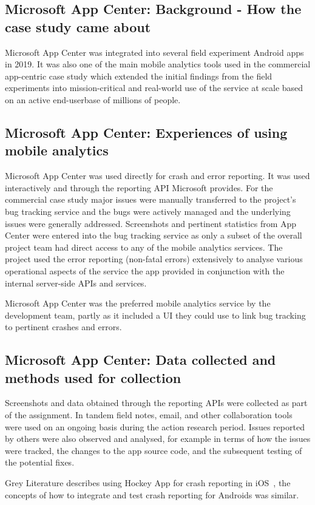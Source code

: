 \subsection{Microsoft App Center: Background - How the case study came about}
Microsoft App Center was integrated into several field experiment Android apps in 2019. It was also one of the main mobile analytics tools used in the commercial app-centric case study which extended the initial findings from the field experiments into mission-critical and real-world use of the service at scale based on an active end-userbase of millions of people.

\subsection{Microsoft App Center: Experiences of using mobile analytics}
Microsoft App Center was used directly for crash and error reporting. It was used interactively and through the reporting API Microsoft provides. For the commercial case study major issues were manually transferred to the project's bug tracking service and the bugs were actively managed and the underlying issues were generally addressed. Screenshots and pertinent statistics from App Center were entered into the bug tracking service as only a subset of the overall project team had direct access to any of the mobile analytics services. The project used the error reporting (non-fatal errors) extensively to analyse various operational aspects of the service the app provided in conjunction with the internal server-side APIs and services.

Microsoft App Center was the preferred mobile analytics service by the development team, partly as it included a UI they could use to link bug tracking to pertinent crashes and errors.

\subsection{Microsoft App Center: Data collected and methods used for collection}
Screenshots and data obtained through the reporting APIs were collected as part of the assignment. In tandem field notes, email, and other collaboration tools were used on an ongoing basis during the action research period. Issues reported by others were also observed and analysed, for example in terms of how the issues were tracked, the changes to the app source code, and the subsequent testing of the potential fixes.

Grey Literature describes using Hockey App for crash reporting in iOS~\citep{birani2016_hockey_app_for_crash_reporting}, the concepts of how to integrate and test crash reporting for Androids was similar.

